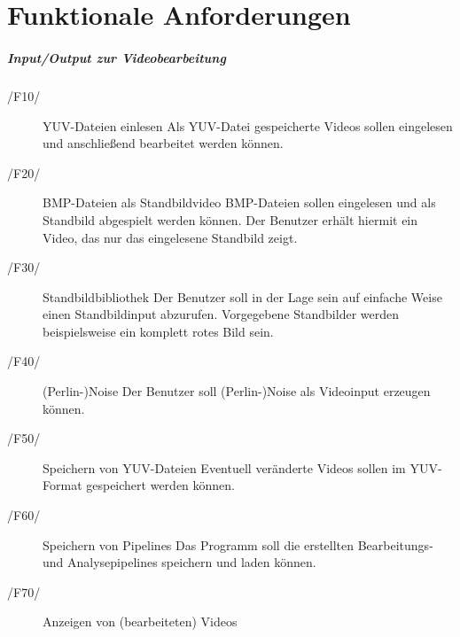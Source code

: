 \section{Funktionale Anforderungen}

\subparagraph{Input/Output zur Videobearbeitung}
 
\begin{description}
        \item[/F10/]YUV-Dateien einlesen \newline
                Als YUV-Datei gespeicherte Videos sollen eingelesen und anschließend bearbeitet werden können.
        \item[/F20/]BMP-Dateien als Standbildvideo\newline
                BMP-Dateien sollen eingelesen und als Standbild abgespielt werden können. Der Benutzer erhält hiermit ein Video, das nur das eingelesene Standbild zeigt.
        \item[/F30/]Standbildbibliothek \newline
                Der Benutzer soll in der Lage sein auf einfache Weise einen Standbildinput abzurufen. Vorgegebene                Standbilder werden beispielsweise ein komplett rotes Bild sein.
        \item[/F40/](Perlin-)Noise \newline
                Der Benutzer soll (Perlin-)Noise als Videoinput erzeugen können.
        \item[/F50/]Speichern von YUV-Dateien \newline
                Eventuell veränderte Videos sollen im YUV-Format gespeichert werden können.
        \item[/F60/]Speichern von Pipelines \newline
                Das Programm soll die erstellten Bearbeitungs- und Analysepipelines speichern und laden können.
        \item[/F70/]Anzeigen von (bearbeiteten) Videos
\end{description}
 
